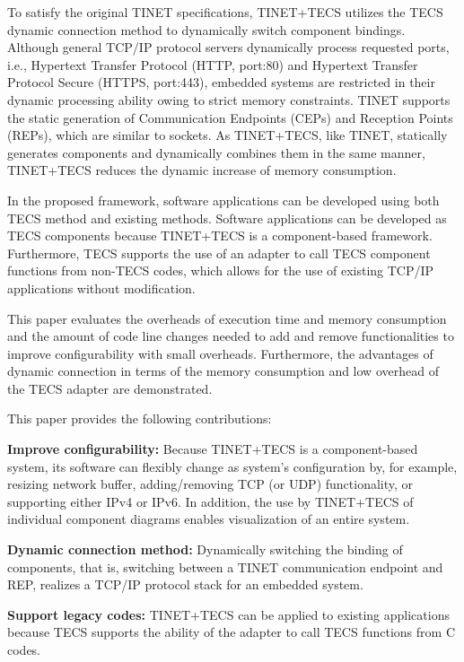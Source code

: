 \documentclass[conference]{IEEEtran/IEEEtran}
\begin{document}
To satisfy the original TINET specifications, TINET+TECS utilizes the TECS dynamic connection method to dynamically switch component bindings.
Although general TCP/IP protocol servers dynamically process requested ports, i.e., Hypertext Transfer Protocol (HTTP, port:80) and Hypertext Transfer Protocol Secure (HTTPS, port:443), embedded systems are restricted in their dynamic processing ability owing to strict memory constraints.
TINET supports the static generation of Communication Endpoints (CEPs) and Reception Points (REPs), which are similar to sockets.
As TINET+TECS, like TINET, statically generates components and dynamically combines them in the same manner, TINET+TECS reduces the dynamic increase of memory consumption.

In the proposed framework, software applications can be developed using both TECS method and existing methods.
Software applications can be developed as TECS components because TINET+TECS is a component-based framework.
Furthermore, TECS supports the use of an adapter to call TECS component functions from non-TECS codes, which allows for the use of existing TCP/IP applications without modification.

This paper evaluates the overheads of execution time and memory consumption and the amount of code line changes needed to add and remove functionalities to improve configurability with small overheads.
Furthermore, the advantages of dynamic connection in terms of the memory consumption and low overhead of the TECS adapter are demonstrated.

This paper provides the following contributions:

{\bf Improve configurability:}
Because TINET+TECS is a component-based system, its software can flexibly change as system's configuration by, for example, resizing network buffer, adding/removing TCP (or UDP) functionality, or supporting either IPv4 or IPv6.
In addition, the use by TINET+TECS of individual component diagrams enables visualization of an entire system.

{\bf Dynamic connection method:}
Dynamically switching the binding of components, that is, switching between a TINET communication endpoint and REP, realizes a TCP/IP protocol stack for an embedded system.
        
{\bf Support legacy codes:}
TINET+TECS can be applied to existing applications because TECS supports the ability of the adapter to call TECS functions from C codes. 
\end{document}
